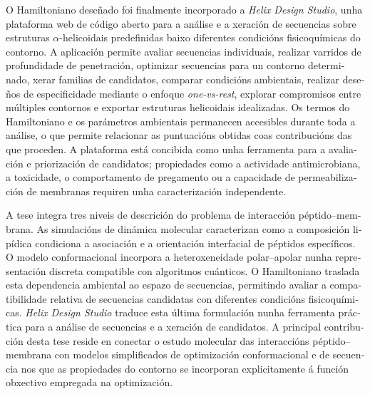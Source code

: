 \begin{otherlanguage}{galician}
O Hamiltoniano deseñado foi finalmente incorporado a \textit{Helix Design Studio}, unha plataforma web de código aberto para a análise e a xeración de secuencias sobre estruturas $\alpha$-helicoidais predefinidas baixo diferentes condicións fisicoquímicas do contorno. A aplicación permite avaliar secuencias individuais, realizar varridos de profundidade de penetración, optimizar secuencias para un contorno determinado, xerar familias de candidatos, comparar condicións ambientais, realizar deseños de especificidade mediante o enfoque \textit{one-vs-rest}, explorar compromisos entre múltiples contornos e exportar estruturas helicoidais idealizadas. Os termos do Hamiltoniano e os parámetros ambientais permanecen accesibles durante toda a análise, o que permite relacionar as puntuacións obtidas coas contribucións das que proceden. A plataforma está concibida como unha ferramenta para a avaliación e priorización de candidatos; propiedades como a actividade antimicrobiana, a toxicidade, o comportamento de pregamento ou a capacidade de permeabilización de membranas requiren unha caracterización independente.

A tese integra tres niveis de descrición do problema de interacción péptido–membrana. As simulacións de dinámica molecular caracterizan como a composición lipídica condiciona a asociación e a orientación interfacial de péptidos específicos. O modelo conformacional incorpora a heteroxeneidade polar–apolar nunha representación discreta compatible con algoritmos cuánticos. O Hamiltoniano traslada esta dependencia ambiental ao espazo de secuencias, permitindo avaliar a compatibilidade relativa de secuencias candidatas con diferentes condicións fisicoquímicas. \textit{Helix Design Studio} traduce esta última formulación nunha ferramenta práctica para a análise de secuencias e a xeración de candidatos. A principal contribución desta tese reside en conectar o estudo molecular das interaccións péptido–membrana con modelos simplificados de optimización conformacional e de secuencia nos que as propiedades do contorno se incorporan explicitamente á función obxectivo empregada na optimización.




\end{otherlanguage}

